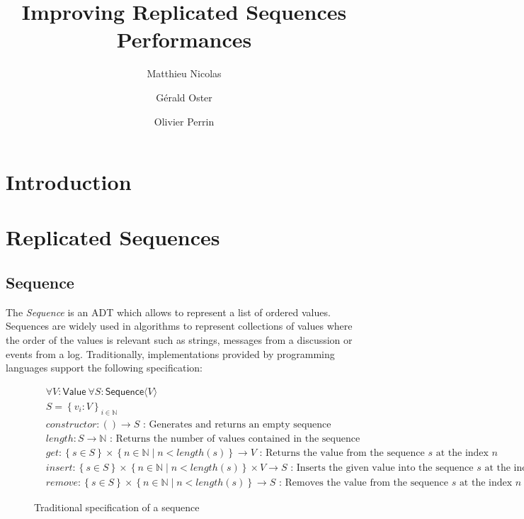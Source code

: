 \documentclass{article}
\newcommand{\fnspec}[3]{#1: #2 \text{ : #3}}
\newcommand{\inbb}[1]{\in \mathbb{#1}}
\newcommand{\mathlist}[2]{\set{#1_i: #2}_{i \inbb{N}}}
\newcommand{\set}[1]{\left\{#1\right\}} %
\newcommand{\ssep}{\mid} %
\newcommand{\tuple}[1]{\langle #1 \rangle}
\theoremstyle{definition}
\begin{document}
\title{Improving Replicated Sequences Performances}
\author{Matthieu Nicolas}
\author{Gérald Oster}
\author{Olivier Perrin}
\date{}

\maketitle

\section{Introduction}

\section{Replicated Sequences}

\subsection{Sequence}

The \emph{Sequence} is an \ac{ADT} which allows to represent a list of ordered values.
Sequences are widely used in algorithms to represent collections of values where the order of the values is relevant such as strings, messages from a discussion or events from a log.
Traditionally, implementations provided by programming languages support the following specification:

\begin{figure}[h]
    \begin{align*}
    &\forall V: \mathsf{Value} \ \forall S: \mathsf{Sequence} \tuple{V}\\
    &S = \mathlist{v}{V}\\
    &\fnspec{constructor}{\left( \right) \to S}{Generates and returns an empty sequence}\\
    &\fnspec{length}{S \to \mathbb{N}}{Returns the number of values contained in the sequence}\\
    &\fnspec{get}{\set{s \in S} \times \set{ n \inbb{N} \ssep n < length(s) } \to V}{Returns the value from the sequence $s$ at the index $n$}\\
    &\fnspec{insert}{\set{s \in S} \times \set{ n \inbb{N} \ssep n < length(s) } \times V \to S}{Inserts the given value into the sequence $s$ at the index $n$ and ... }\\ %
    &\fnspec{remove}{\set{s \in S} \times \set{ n \inbb{N} \ssep n < length(s) } \to S}{Removes the value from the sequence $s$ at the index $n$ and returns ... }%
    \end{align*}
    \caption{Traditional specification of a sequence}
    \label{fig:spec-seq}
\end{figure}
\\
\end{document}

